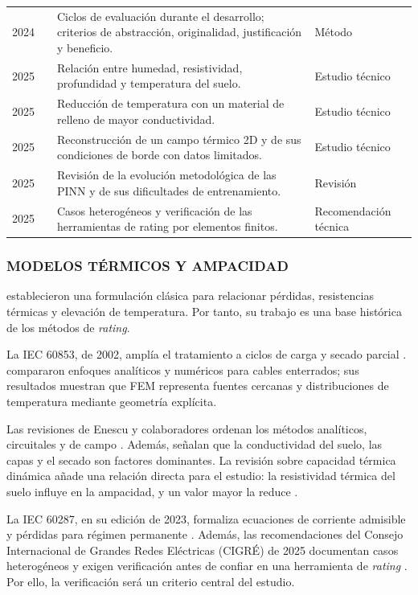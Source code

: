 \begin{longtable}{L{1.1cm}L{3.4cm}L{7.6cm}L{2.4cm}}
2024 & \textcite{delport2024} & Ciclos de evaluación durante el desarrollo; criterios de abstracción, originalidad, justificación y beneficio. & Método \\
2025 & \textcite{khumalo2025} & Relación entre humedad, resistividad, profundidad y temperatura del suelo. & Estudio técnico \\
2025 & \textcite{kim2025} & Reducción de temperatura con un material de relleno de mayor conductividad. & Estudio técnico \\
2025 & \textcite{pan2025} & Reconstrucción de un campo térmico 2D y de sus condiciones de borde con datos limitados. & Estudio técnico \\
2025 & \textcite{ren2025} & Revisión de la evolución metodológica de las PINN y de sus dificultades de entrenamiento. & Revisión \\
2025 & \textcite{cigre2025} & Casos heterogéneos y verificación de las herramientas de rating por elementos finitos. & Recomendación técnica \\
\bottomrule
\end{longtable}\endgroup

\subsubsection{MODELOS TÉRMICOS Y AMPACIDAD}

\textcite[752--772]{neher1957} establecieron una formulación clásica para relacionar pérdidas, resistencias térmicas y elevación de temperatura. Por tanto, su trabajo es una base histórica de los métodos de \textit{rating}.

La IEC 60853, de 2002, amplía el tratamiento a ciclos de carga y secado parcial \parencite[cláusulas 2--4]{iec60853}. \textcite[1387--1400]{aras2005} compararon enfoques analíticos y numéricos para cables enterrados; sus resultados muestran que FEM representa fuentes cercanas y distribuciones de temperatura mediante geometría explícita.

Las revisiones de Enescu y colaboradores ordenan los métodos analíticos, circuitales y de campo \parencite[4,11,17]{enescu2020}. Además, señalan que la conductividad del suelo, las capas y el secado son factores dominantes. La revisión sobre capacidad térmica dinámica añade una relación directa para el estudio: la resistividad térmica del suelo influye en la ampacidad, y un valor mayor la reduce \parencite[3--6]{enescu2021}.

La IEC 60287, en su edición de 2023, formaliza ecuaciones de corriente admisible y pérdidas para régimen permanente \parencite[cláusulas 4--5]{iec60287}. Además, las recomendaciones del Consejo Internacional de Grandes Redes Eléctricas (CIGRÉ) de 2025 documentan casos heterogéneos y exigen verificación antes de confiar en una herramienta de \textit{rating} \parencite[3--4,41--42,93--99]{cigre2025}. Por ello, la verificación será un criterio central del estudio.


